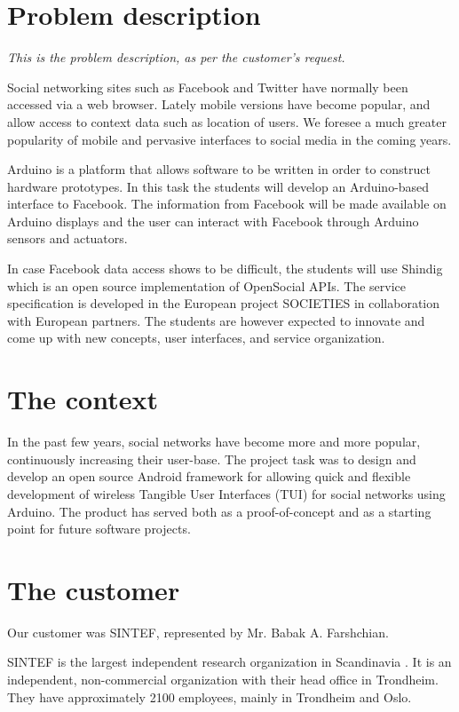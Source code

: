 \section{Problem description}

\emph{This is the problem description, as per the customer's request.}

Social networking sites such as Facebook\cite{link:facebook} and Twitter\cite{link:twitter}
have normally been accessed  via a web browser. Lately mobile versions have become popular,
and allow access to context data such as location of users. We foresee a much greater popularity
of mobile and pervasive interfaces to social media in the coming years.

Arduino\cite{link:arduino} is a platform that allows software to be written in order to construct
hardware prototypes. In this task the students will develop an Arduino-based interface to Facebook.
The information from Facebook will be made available on Arduino displays and the user can interact
with Facebook through Arduino sensors and actuators.

In case Facebook data access shows to be difficult, the students will use Shindig\cite{link:shinding} which 
is an open source implementation of OpenSocial\cite{link:opensocial} APIs. The service specification is developed
in the European project SOCIETIES in collaboration with European partners. The students are however expected to
innovate and come up with new concepts, user interfaces, and service organization.

\section{The context}
In the past few years, social networks have become more and more popular, continuously increasing their user-base.
The project task was to design and develop an open source Android\cite{link:android} framework for allowing quick
and flexible development of wireless Tangible User Interfaces (TUI) for social networks using Arduino.
The product has served both as a proof-of-concept and as a starting point for future software projects.

\section{The customer}
Our customer was SINTEF, represented by Mr. Babak A. Farshchian.

SINTEF is the largest independent research organization in Scandinavia \cite{link:sintef}.
It is an independent, non-commercial organization with their head office in Trondheim.
They have approximately 2100 employees, mainly in Trondheim and Oslo.

